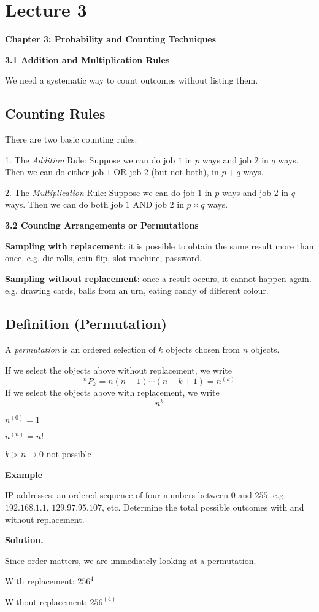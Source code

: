 \section{Lecture 3}

\textbf{\textbf{Chapter 3: Probability and Counting Techniques}}

\textbf{3.1 Addition and Multiplication Rules}

We need a systematic way to count outcomes without listing them.

\begin{defbox}
    \subsection{Counting Rules}
    There are two basic counting rules:

    1. The \emph{Addition} Rule:
    Suppose we can do job $1$ in $p$ ways and job $2$ in $q$ ways.
    Then we can do either job $1$ OR job $2$ (but not both), in $p + q$ ways.
    
    2. The \emph{Multiplication} Rule:
    Suppose we can do job $1$ in $p$ ways and job $2$ in $q$ ways.
    Then we can do both job $1$ AND job $2$ in $p \times q$ ways.
\end{defbox}

\textbf{3.2 Counting Arrangements or Permutations}

\textbf{Sampling with replacement}: it is possible to obtain
the same result more than once. e.g. die rolls, coin flip, slot machine, password.

\textbf{Sampling without replacement}: once a result occurs, it cannot happen again.
e.g. drawing cards, balls from an urn, eating candy of different colour.

\begin{defbox}
    \subsection{Definition (Permutation)}
    A \emph{permutation} is an ordered selection of $ k $
    objects chosen from $ n $ objects.

    If we select the objects above without replacement, we write
    \[ ^nP_k =n(n-1)\cdots(n-k+1)=n^{(k)} \]
    If we select the objects above with replacement, we write
    \[ n^k \]
\end{defbox}
$ n^{(0)}=1 $

$ n^{(n)}=n! $

$ k>n\rightarrow 0 $ not possible

\textbf{Example}

IP addresses: an ordered sequence of four numbers between $ 0 $ and $ 255 $.
e.g. $ 192.168.1.1 $, $ 129.97.95.107 $, etc. Determine the
total possible outcomes with and without replacement.

\textbf{Solution.}

Since order matters, we are immediately looking at a permutation.

With replacement: $ 256^4 $

Without replacement: $ 256^{(4)} $
